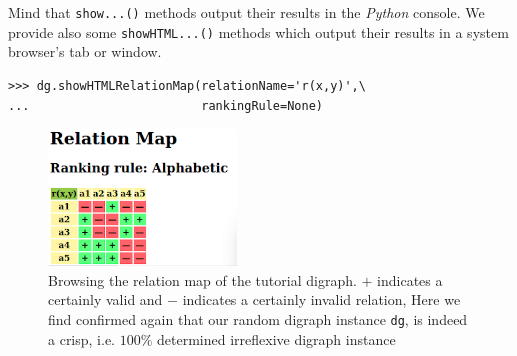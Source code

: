 Mind that \texttt{show...()} methods output their results in the \emph{Python} console. We provide also some \texttt{showHTML...()} methods which output their results in a system browser’s tab or window.
\begin{lstlisting}
>>> dg.showHTMLRelationMap(relationName='r(x,y)',\
...                        rankingRule=None)
\end{lstlisting}
\begin{figure}[h]
\sidecaption[t]
\includegraphics[width=5cm]{Figures/1-2-relationMap1.png}
\caption{Browsing the relation map of the tutorial digraph. $+$ indicates a certainly valid and $-$ indicates a certainly  invalid relation, Here we find confirmed again that our random digraph instance \texttt{dg}, is indeed a crisp, i.e. $100\%$ determined irreflexive digraph instance}
\label{fig:1.2}       %
\end{figure}


